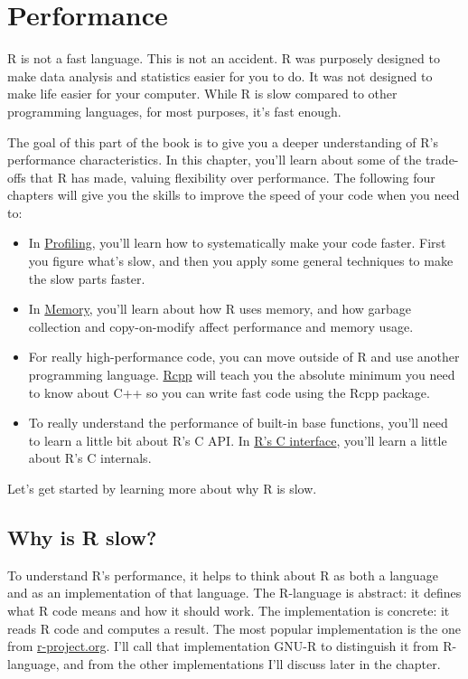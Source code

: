 \chapter{Performance}\label{performance}

R is not a fast language. This is not an accident. R was purposely
designed to make data analysis and statistics easier for you to do. It
was not designed to make life easier for your computer. While R is slow
compared to other programming languages, for most purposes, it's fast
enough. 

The goal of this part of the book is to give you a deeper understanding
of R's performance characteristics. In this chapter, you'll learn about
some of the trade-offs that R has made, valuing flexibility over
performance. The following four chapters will give you the skills to
improve the speed of your code when you need to:

\begin{itemize}
\item
  In \hyperref[profiling]{Profiling}, you'll learn how to systematically
  make your code faster. First you figure what's slow, and then you
  apply some general techniques to make the slow parts faster.
\item
  In \hyperref[memory]{Memory}, you'll learn about how R uses memory,
  and how garbage collection and copy-on-modify affect performance and
  memory usage.
\item
  For really high-performance code, you can move outside of R and use
  another programming language. \hyperref[rcpp]{Rcpp} will teach you the
  absolute minimum you need to know about C++ so you can write fast code
  using the Rcpp package.
\item
  To really understand the performance of built-in base functions,
  you'll need to learn a little bit about R's C API. In
  \hyperref[c-api]{R's C interface}, you'll learn a little about R's C
  internals.
\end{itemize}

Let's get started by learning more about why R is slow.

\section{Why is R slow?}\label{why-is-r-slow}

To understand R's performance, it helps to think about R as both a
language and as an implementation of that language. The R-language is
abstract: it defines what R code means and how it should work. The
implementation is concrete: it reads R code and computes a result. The
most popular implementation is the one from
\href{http://r-project.org}{r-project.org}. I'll call that
implementation GNU-R to distinguish it from R-language, and from the
other implementations I'll discuss later in the chapter.

